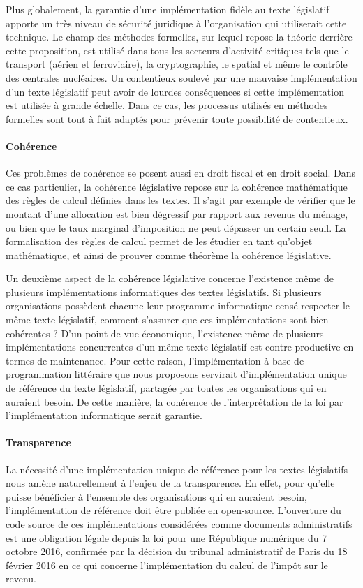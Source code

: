\documentclass[12pt, french]{article}
\begin{document}
Plus globalement, la garantie d'une implémentation fidèle au texte législatif apporte un très niveau de sécurité juridique à l'organisation qui utiliserait cette technique. Le champ des méthodes formelles, sur lequel repose la théorie derrière cette proposition, est utilisé dans tous les secteurs d'activité critiques tels que le transport (aérien et ferroviaire), la cryptographie, le spatial et même le contrôle des centrales nucléaires. Un contentieux soulevé par une mauvaise implémentation d'un texte législatif peut avoir de lourdes conséquences si cette implémentation est utilisée à grande échelle. Dans ce cas, les processus utilisés en méthodes formelles sont tout à fait adaptés pour prévenir toute possibilité de contentieux.

\paragraph{Cohérence} Ces problèmes de cohérence se posent aussi en droit fiscal et en droit social. Dans ce cas particulier, la cohérence législative repose sur la cohérence mathématique des règles de calcul définies dans les textes. Il s'agit par exemple de vérifier que le montant d'une allocation est bien dégressif par rapport aux revenus du ménage, ou bien que le taux marginal d'imposition ne peut dépasser un certain seuil. La formalisation des règles de calcul permet de les étudier en tant qu'objet mathématique, et ainsi de prouver comme théorème la cohérence législative.

Un deuxième aspect de la cohérence législative concerne l'existence même de plusieurs implémentations informatiques des textes législatifs. Si plusieurs organisations possèdent chacune leur programme informatique censé respecter le même texte législatif, comment s'assurer que ces implémentations sont bien cohérentes ? D'un point de vue économique, l'existence même de plusieurs implémentations concurrentes d'un même texte législatif est contre-productive en termes de maintenance. Pour cette raison, l'implémentation à base de programmation littéraire que nous proposons servirait d'implémentation unique de référence du texte législatif, partagée par toutes les organisations qui en auraient besoin. De cette manière, la cohérence de l'interprétation de la loi par l'implémentation informatique serait garantie.

\paragraph{Transparence} La nécessité d'une implémentation unique de référence pour les textes législatifs nous amène naturellement à l'enjeu de la transparence. En effet, pour qu'elle puisse bénéficier à l'ensemble des organisations qui en auraient besoin, l'implémentation de référence doit être publiée en open-source. L'ouverture du code source de ces implémentations considérées comme documents administratifs est une obligation légale depuis la loi pour une République numérique du 7 octobre 2016, confirmée par la décision du tribunal administratif de Paris du 18 février 2016 en ce qui concerne l'implémentation du calcul de l'impôt sur le revenu.
\end{document}

